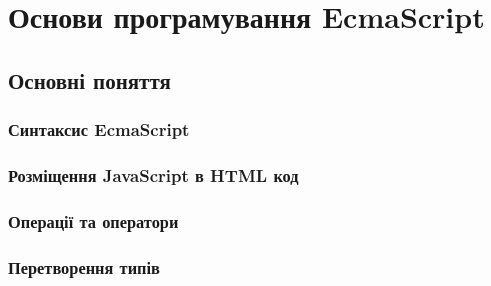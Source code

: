 \part{Основи програмування EcmaScript}
\chapter{Основні поняття}
\section{Синтаксис EcmaScript}
\nopagebreak[4]



\pagebreak[3]

\section{Розміщення JavaScript в HTML код}
\nopagebreak[4]



\pagebreak[3]

\section{Операції та оператори}
\nopagebreak[4]



\pagebreak[3]
\section{Перетворення типів}
\nopagebreak[4]



\pagebreak[3]
